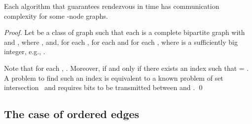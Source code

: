 \documentclass{llncs}
\begin{document}
\begin{theorem} \label{thm:arbitrary+comm+lower}
Each algorithm that guarantees rendezvous in time  has communication complexity  for some -node graphs.
\end{theorem}

\begin{proof}
Let  be a class of graph such that each  is a complete bipartite graph  
with 
and , where
,
and, for each ,  for each  and  for each ,
where  is a sufficiently big integer, e.g., .

Note that for each , .
Moreover,  if and only if there exists an index  such that  = .
A problem to find such an index  is equivalent to a known problem of set intersection~\cite{Kalyanasundaram:1992:PCC:140820.140844}
and requires  bits to be transmitted between  and .
\qed\end{proof}


\subsection{The case of ordered edges}
\end{document}
